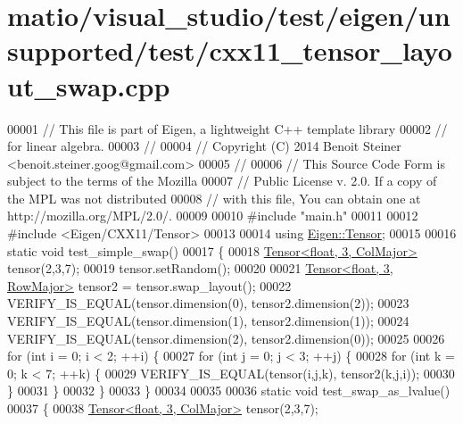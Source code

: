 \hypertarget{matio_2visual__studio_2test_2eigen_2unsupported_2test_2cxx11__tensor__layout__swap_8cpp_source}{}\section{matio/visual\+\_\+studio/test/eigen/unsupported/test/cxx11\+\_\+tensor\+\_\+layout\+\_\+swap.cpp}
\label{matio_2visual__studio_2test_2eigen_2unsupported_2test_2cxx11__tensor__layout__swap_8cpp_source}

\begin{DoxyCode}
00001 \textcolor{comment}{// This file is part of Eigen, a lightweight C++ template library}
00002 \textcolor{comment}{// for linear algebra.}
00003 \textcolor{comment}{//}
00004 \textcolor{comment}{// Copyright (C) 2014 Benoit Steiner <benoit.steiner.goog@gmail.com>}
00005 \textcolor{comment}{//}
00006 \textcolor{comment}{// This Source Code Form is subject to the terms of the Mozilla}
00007 \textcolor{comment}{// Public License v. 2.0. If a copy of the MPL was not distributed}
00008 \textcolor{comment}{// with this file, You can obtain one at http://mozilla.org/MPL/2.0/.}
00009 
00010 \textcolor{preprocessor}{#include "main.h"}
00011 
00012 \textcolor{preprocessor}{#include <Eigen/CXX11/Tensor>}
00013 
00014 \textcolor{keyword}{using} \hyperlink{class_eigen_1_1_tensor}{Eigen::Tensor};
00015 
00016 \textcolor{keyword}{static} \textcolor{keywordtype}{void} test\_simple\_swap()
00017 \{
00018   \hyperlink{class_eigen_1_1_tensor}{Tensor<float, 3, ColMajor>} tensor(2,3,7);
00019   tensor.setRandom();
00020 
00021   \hyperlink{class_eigen_1_1_tensor}{Tensor<float, 3, RowMajor>} tensor2 = tensor.swap\_layout();
00022   VERIFY\_IS\_EQUAL(tensor.dimension(0), tensor2.dimension(2));
00023   VERIFY\_IS\_EQUAL(tensor.dimension(1), tensor2.dimension(1));
00024   VERIFY\_IS\_EQUAL(tensor.dimension(2), tensor2.dimension(0));
00025 
00026   \textcolor{keywordflow}{for} (\textcolor{keywordtype}{int} i = 0; i < 2; ++i) \{
00027     \textcolor{keywordflow}{for} (\textcolor{keywordtype}{int} j = 0; j < 3; ++j) \{
00028       \textcolor{keywordflow}{for} (\textcolor{keywordtype}{int} k = 0; k < 7; ++k) \{
00029         VERIFY\_IS\_EQUAL(tensor(i,j,k), tensor2(k,j,i));
00030       \}
00031     \}
00032   \}
00033 \}
00034 
00035 
00036 \textcolor{keyword}{static} \textcolor{keywordtype}{void} test\_swap\_as\_lvalue()
00037 \{
00038   \hyperlink{class_eigen_1_1_tensor}{Tensor<float, 3, ColMajor>} tensor(2,3,7);

\end{DoxyCode}
